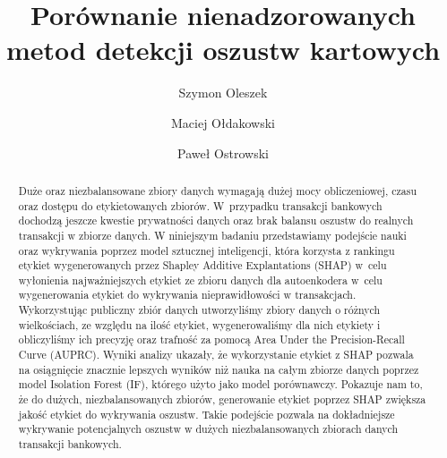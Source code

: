 \documentclass [runningheads]{llncs}
\begin{document}
%
\title{Porównanie nienadzorowanych metod detekcji oszustw kartowych}

%
\author{Szymon Oleszek\and
Maciej Ołdakowski\and
Paweł Ostrowski}
%

%
\maketitle              
%
\begin{abstract}
Duże oraz niezbalansowane zbiory danych wymagają dużej mocy obliczeniowej, czasu oraz dostępu do etykietowanych zbiorów.
W~przypadku transakcji bankowych dochodzą jeszcze kwestie prywatności danych oraz brak balansu oszustw do realnych transakcji w zbiorze danych.
W niniejszym badaniu przedstawiamy podejście nauki oraz wykrywania poprzez model sztucznej inteligencji, która korzysta z rankingu etykiet
wygenerowanych przez Shapley Additive Explantations (SHAP) w~celu wyłonienia najważniejszych etykiet ze zbioru danych dla autoenkodera
w~celu wygenerowania etykiet do wykrywania nieprawidłowości w transakcjach. Wykorzystując publiczny zbiór danych utworzyliśmy
zbiory danych o różnych wielkościach, ze względu na ilość etykiet, wygenerowaliśmy dla nich etykiety i obliczyliśmy ich precyzję
oraz trafność za pomocą Area Under the Precision-Recall Curve (AUPRC). Wyniki analizy ukazały, że wykorzystanie etykiet z SHAP
pozwala na osiągnięcie znacznie lepszych wyników niż nauka na całym zbiorze danych poprzez model Isolation Forest (IF),
którego użyto jako model porównawczy. Pokazuje nam to, że do dużych, niezbalansowanych zbiorów, generowanie etykiet poprzez
SHAP zwiększa jakość etykiet do wykrywania oszustw. Takie podejście pozwala na dokładniejsze wykrywanie potencjalnych oszustw
w dużych niezbalansowanych zbiorach danych transakcji bankowych.

\end{abstract}
\end{document}

